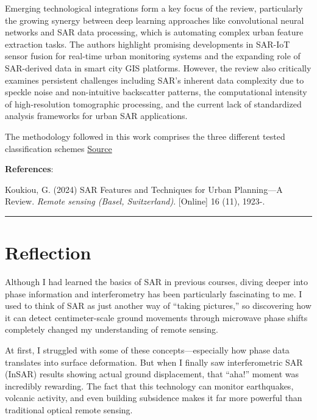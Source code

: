 \documentclass[
  letterpaper,
  DIV=11,
  numbers=noendperiod]{scrreprt}
\begin{document}
Emerging technological integrations form a key focus of the review,
particularly the growing synergy between deep learning approaches like
convolutional neural networks and SAR data processing, which is
automating complex urban feature extraction tasks. The authors highlight
promising developments in SAR-IoT sensor fusion for real-time urban
monitoring systems and the expanding role of SAR-derived data in smart
city GIS platforms. However, the review also critically examines
persistent challenges including SAR's inherent data complexity due to
speckle noise and non-intuitive backscatter patterns, the computational
intensity of high-resolution tomographic processing, and the current
lack of standardized analysis frameworks for urban SAR applications.

The methodology followed in this work comprises the three different
tested classification schemes
\href{https://www.researchgate.net/publication/380914201_SAR_Features_and_Techniques_for_Urban_Planning-A_Review}{Source}

\textbf{References}:

Koukiou, G. (2024) SAR Features and Techniques for Urban Planning---A
Review. \emph{Remote sensing (Basel, Switzerland)}. {[}Online{]} 16
(11), 1923-.

\begin{center}\rule{0.5\linewidth}{0.5pt}\end{center}

\section{Reflection}\label{reflection-6}

Although I had learned the basics of SAR in previous courses, diving
deeper into phase information and interferometry has been particularly
fascinating to me. I used to think of SAR as just another way of
``taking pictures,'' so discovering how it can detect centimeter-scale
ground movements through microwave phase shifts completely changed my
understanding of remote sensing.

At first, I struggled with some of these concepts---especially how phase
data translates into surface deformation. But when I finally saw
interferometric SAR (InSAR) results showing actual ground displacement,
that ``aha!'' moment was incredibly rewarding. The fact that this
technology can monitor earthquakes, volcanic activity, and even building
subsidence makes it far more powerful than traditional optical remote
sensing.
\end{document}
